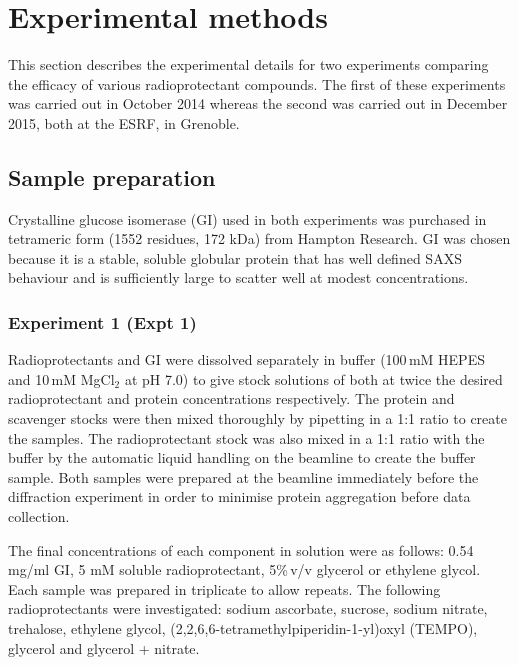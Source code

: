 \section{Experimental methods}
\label{sec:Experimental methods - SAXS}
This section describes the experimental details for two experiments comparing the efficacy of various radioprotectant compounds.
The first of these experiments was carried out in October 2014 whereas the second was carried out in December 2015, both at the ESRF, in Grenoble.

\subsection{Sample preparation}
\label{sub:Sample preparation}
Crystalline glucose isomerase (GI) used in both experiments was purchased in tetrameric form (1552 residues, 172 kDa) from Hampton Research. GI was chosen because it is a stable, soluble globular protein that has well defined SAXS behaviour and is sufficiently large to scatter well at modest concentrations.

\subsubsection{Experiment 1 (Expt 1)}
\label{subs:Experiment 1 - sample prep}
Radioprotectants and GI were dissolved separately in buffer (100$\,$mM HEPES and 10$\,$mM MgCl$_{\text{2}}$ at pH 7.0) to give stock solutions of both at twice the desired radioprotectant and protein concentrations respectively.
The protein and scavenger stocks were then mixed thoroughly by pipetting in a 1:1 ratio to create the samples.
The radioprotectant stock was also mixed in a 1:1 ratio with the buffer by the automatic liquid handling on the beamline to create the buffer sample.
Both samples were prepared at the beamline immediately before the diffraction experiment in order to minimise protein aggregation before data collection.

The final concentrations of each component in solution were as follows:
0.54 mg/ml GI, 5 mM soluble radioprotectant, 5\%$\,$v/v glycerol or ethylene glycol.
Each sample was prepared in triplicate to allow repeats. The following radioprotectants were investigated: sodium ascorbate, sucrose, sodium nitrate, trehalose, ethylene glycol, (2,2,6,6-tetramethylpiperidin-1-yl)oxyl (TEMPO), glycerol and glycerol + nitrate.


